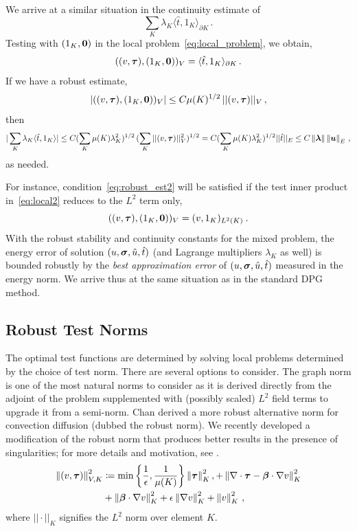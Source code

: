 \documentclass[Proposal.tex]{subfiles}
\begin{document}
We arrive at a similar situation in the continuity estimate of
$$
\sum_K \lambda_K \langle \hat{t}, 1_K \rangle_{\partial K}\,.
$$
Testing with $(1_K,{\bf 0})$ in the local problem~\eqref{eq:local_problem}, we obtain,
\begin{equation}
((v,\boldsymbol\tau),(1_K,{\bf 0}))_V = \langle \hat{t}, 1_K \rangle_{\partial K}\,.
\label{eq:local2}
\end{equation}
If we have a robust estimate,
\begin{equation}
| ((v,\boldsymbol\tau),(1_K,{\bf 0}))_V | \leq C \mu(K)^{1/2} \, || (v,\boldsymbol\tau) ||_V\,,
\label{eq:robust_est2}
\end{equation}
then
\begin{equation}
| \sum_K \lambda_K \langle \hat{t}, 1_K \rangle | \leq C (\sum_K \mu(K) \lambda_K^2)^{1/2}
\, (\sum_K || (v,\boldsymbol\tau) ||_V^2)^{1/2}
= C (\sum_K \mu(K) \lambda_K^2)^{1/2}  || \hat{t} ||_E
\leq C\left\| \boldsymbol\lambda \right\|\left\| \boldsymbol u \right\|_E
\,,
\end{equation}
as needed.

For instance, condition~\eqref{eq:robust_est2} will be satisfied if the test inner product
in~\eqref{eq:local2} reduces to the $L^2$ term only,
\begin{equation}
((v,\boldsymbol\tau),(1_K,{\bf 0}))_V = (v,1_K)_{L^2(K)} \: .
\end{equation}
With the robust stability and continuity constants for the mixed problem, the energy error
of solution $(u,\boldsymbol\sigma,\hat{u},\hat{t})$ (and Lagrange multipliers $\lambda_K$ as well)
is bounded robustly by the {\em best approximation error} of  $(u,\boldsymbol\sigma,\hat{u},\hat{t})$
measured in the energy norm. We arrive thus at the same situation as in the standard
DPG method.


\subsection{Robust Test Norms}
\label{sec:robustNorms}
The optimal test functions are determined by solving local problems determined
by the choice of test norm. There are several options to consider.
The graph norm \cite{DPGOverview2} is one of the most natural norms to consider
as it is derived directly from the adjoint of the problem supplemented with
(possibly scaled) $L^2$ field terms to upgrade it from a semi-norm.
Chan \etal\cite{ChanHeuerThanhDemkowicz2012} derived a more robust alternative
norm for convection diffusion (dubbed the robust norm). We recently
developed a modification of the robust norm that produces better
results in the presence of singularities; 
for more details and motivation, see \cite{JesseDissertation}.
\begin{align}
\left\| \left( v,\boldsymbol\tau \right) \right\|_{V,K}^2 &\coloneqq
\min\left\{\frac{1}{\epsilon},\frac{1}{\mu(K)}\right\}\left\| \boldsymbol\tau \right\|_K^2,
+ \left\| \nabla\cdot \boldsymbol\tau - \boldsymbol\beta\cdot\nabla v \right\|_K^2 \nonumber\\
&+\left\| \boldsymbol\beta\cdot \nabla v \right\|_K^2
+ \epsilon\left\| \nabla v \right\|_K^2
+ \left\| v \right\|^2_K\,,
\end{align}
where $||\cdot||_K$ signifies the $L^2$ norm over element $K$.\
\end{document}

